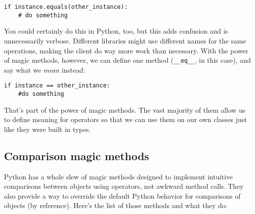 \documentclass[a4paper,11pt]{article}
\newcommand{\code}[1]{\texttt{#1}}
\begin{document}
\begin{lstlisting}
if instance.equals(other_instance):
    # do something
\end{lstlisting}

\noindent
You could certainly do this in Python, too, but this adds confusion and is unnecessarily verbose. Different libraries might use different names for the same operations, making the client do way more work than necessary. With the power of magic methods, however, we can define one method (\code{__eq__}, in this case), and say what we \emph{mean} instead:

\begin{lstlisting}
if instance == other_instance:
    #do something
\end{lstlisting}

\noindent
That's part of the power of magic methods. The vast majority of them allow us to define meaning for operators so that we can use them on our own classes just like they were built in types.

\subsection{Comparison magic methods}

Python has a whole slew of magic methods designed to implement intuitive comparisons between objects using operators, not awkward method calls. They also provide a way to override the default Python behavior for comparisons of objects (by reference). Here's the list of those methods and what they do:
\end{document}
